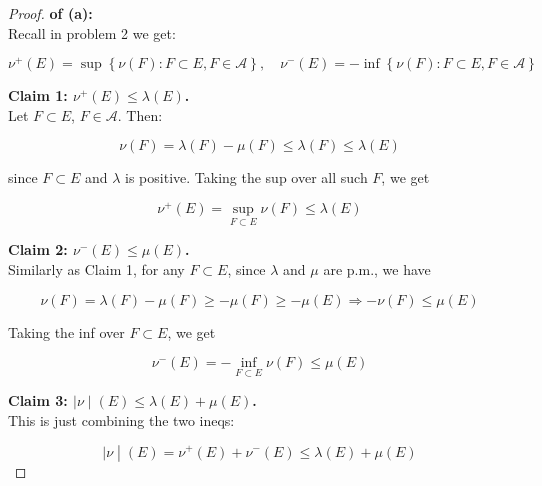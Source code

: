 \begin{proof}

\textbf{of (a):}\\
Recall in problem 2 we get:

\[\nu^{+}(E) = \sup\left\{ {\nu(F):F \subset E,F \in \mathcal{A}} \right\},\quad\nu^{-}(E) = - \inf\left\{ {\nu(F):F \subset E,F \in \mathcal{A}} \right\}\]

\textbf{Claim 1: \(\nu^{+}(E) \leq \lambda(E)\).}\\
Let \(F \subset E\), \(F \in \mathcal{A}\). Then:

\[\nu(F) = \lambda(F) - \mu(F) \leq \lambda(F) \leq \lambda(E)\]

since \(F \subset E\) and \(\lambda\) is positive. Taking the sup over all such \(F\), we get

\[\nu^{+}(E) = \sup\limits_{F \subset E}\nu(F) \leq \lambda(E)\]

\textbf{Claim 2: \(\nu^{-}(E) \leq \mu(E)\).}\\
Similarly as Claim 1, for any \(F \subset E\), since \(\lambda\) and \(\mu\) are p.m., we have

\[\nu(F) = \lambda(F) - \mu(F) \geq - \mu(F) \geq - \mu(E)\Longrightarrow - \nu(F) \leq \mu(E)\]

Taking the inf over \(F \subset E\), we get

\[\nu^{-}(E) = - \inf\limits_{F \subset E}\nu(F) \leq \mu(E)\]

\textbf{Claim 3: \(\left. |\nu \middle| (E) \leq \lambda(E) + \mu(E) \right.\).}\\
This is just combining the two ineqs:

\[\left. |\nu \middle| (E) = \nu^{+}(E) + \nu^{-}(E) \leq \lambda(E) + \mu(E) \right.\]

\end{proof}

